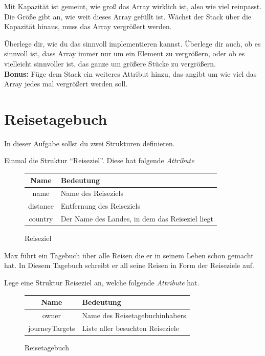 \documentclass[c_worksheet.tex]{subfiles}
\begin{document}
Mit Kapazität ist gemeint, wie groß das Array wirklich ist, also wie viel reinpasst. Die Größe gibt an, wie weit dieses Array gefüllt ist. Wächst der Stack über die Kapazität hinaus, muss das Array vergrößert werden.

Überlege dir, wie du das sinnvoll implementieren kannst. Überlege dir auch, ob es sinnvoll ist, dass Array immer nur um ein Element zu vergrößern, oder ob es vielleicht sinnvoller ist, das ganze um größere Stücke zu vergrößern. \\

\textbf{Bonus:} Füge dem Stack ein weiteres Attribut hinzu, das angibt um wie viel das Array jedes mal vergrößert werden soll.



\section{Reisetagebuch}

In dieser Aufgabe sollst du zwei Strukturen definieren.

Einmal die Struktur ``Reiseziel''. Diese hat folgende \emph{Attribute}

\begin{figure}[h]
\center
\begin{tabular}{ c | l }
\textbf{Name}     & \textbf{Bedeutung} \\
\hline
name     & Name des Reiseziels \\
distance & Entfernung des Reiseziels \\
country  & Der Name des Landes, in dem das Reiseziel liegt \\
\end{tabular}
\caption{Reiseziel} 
\end{figure}

Max führt ein Tagebuch über alle Reisen die er in seinem Leben schon gemacht hat. In Diesem Tagebuch schreibt er all seine Reisen in Form der Reiseziele auf.

Lege eine Struktur Reiseziel an, welche folgende \emph{Attribute} hat.

\begin{figure}[h]
\center
\begin{tabular}{ c | l }
\textbf{Name} & \textbf{Bedeutung} \\
\hline
owner  & Name des Reisetagebuchinhabers \\
journeyTargets & Liste aller besuchten Reiseziele \\
\end{tabular}
\caption{Reisetagebuch} 
\end{figure}
\end{document}
